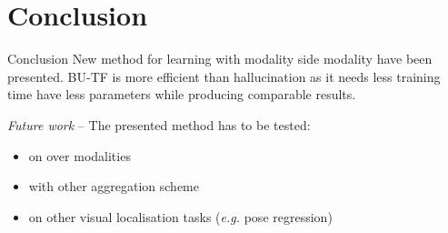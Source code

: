 \section{Conclusion}

\label{subsec:conlusion}

\begin{frame}{Conclusion}
	\vfill
	New method for learning with modality side modality have been presented. BU-TF is more efficient than hallucination as it needs less training time have less parameters while producing comparable results.
	\vfill
	\uncover<2->
	{


		\textit{Future work} -- The presented method has to be tested:
		\begin{itemize}
			\item<2-> on over modalities
			\item<3-> with other aggregation scheme
			\item<4-> on other visual localisation tasks (\textit{e.g.} pose regression)
		\end{itemize}
	}	
\end{frame}
